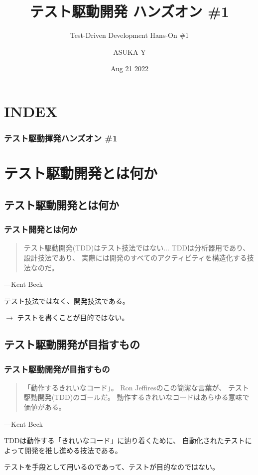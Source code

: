 \documentclass[aspectratio=169]{beamer}
\title{テスト駆動開発 ハンズオン \#1}
\subtitle{Test-Driven Development Hans-On \#1}
\author{ASUKA Y}
\date{Aug 21 2022}
\begin{document}
\begin{frame}
  \titlepage
\end{frame}

\section*{INDEX}
\begin{frame}
  \frametitle{テスト駆動揮発ハンズオン \#1}
  \tableofcontents
\end{frame}

\section{テスト駆動開発とは何か}
\subsection{テスト駆動開発とは何か}
\begin{frame}\frametitle{テスト開発とは何か}
  \begin{quote}
    テスト駆動開発(TDD)はテスト技法ではない...
    TDDは分析器用であり、設計技法であり、
    実際には開発のすべてのアクティビティを構造化する技法なのだ。
  \end{quote}
  \begin{flushright}
    ---Kent Beck
  \end{flushright}

  テスト技法ではなく、開発技法である。

  {
    \large \color{blue}
    $\rightarrow$
    テストを書くことが目的ではない。
  }
\end{frame}

\subsection{テスト駆動開発が目指すもの}
\begin{frame}\frametitle{テスト駆動開発が目指すもの}
  \begin{quote}
    「動作するきれいなコード」。
    Ron Jeffiresのこの簡潔な言葉が、
    テスト駆動開発(TDD)のゴールだ。
    動作するきれいなコードはあらゆる意味で価値がある。
  \end{quote}
  \begin{flushright}
    ---Kent Beck
  \end{flushright}

  TDDは動作する「きれいなコード」に辿り着くために、
  {\color{blue} 自動化されたテストによって開発を推し進める技法}である。

  \begin{center}
    \color{red} \large テストを手段として用いるのであって、テストが目的なのではない。
  \end{center}
\end{frame}
\end{document}
